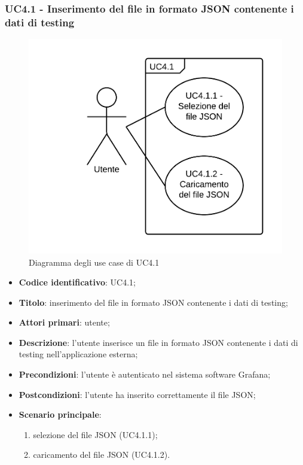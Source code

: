 \subsubsection{UC4.1 - Inserimento del file in formato JSON contenente i dati di testing}
\begin{figure}[H]
\includegraphics{img/UC4_1_-_Inserimento_del_file_in_formato_JSON_contenente_i_dati_di_testing.png}
\caption{Diagramma degli use case di UC4.1}
\end{figure}
\begin{itemize}
    \item \textbf{Codice identificativo}: UC4.1;
    \item \textbf{Titolo}: inserimento del file in formato JSON contenente i dati di testing;
    \item \textbf{Attori primari}: utente;
    \item \textbf{Descrizione}: l'utente inserisce un file in formato JSON contenente i dati di testing nell'applicazione esterna;
    \item \textbf{Precondizioni}: l'utente è autenticato nel sistema software Grafana\glo;
    \item \textbf{Postcondizioni}: l'utente ha inserito correttamente il file JSON;
    \item \textbf{Scenario principale}:
		\begin{enumerate}
			\item selezione del file JSON (UC4.1.1);
			\item caricamento del file JSON (UC4.1.2).
		\end{enumerate}
\end{itemize}
